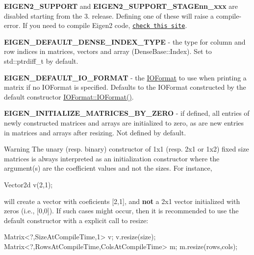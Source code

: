 \begin{DoxyItemize}
\item {\bfseries E\+I\+G\+E\+N2\+\_\+\+S\+U\+P\+P\+O\+RT} and {\bfseries E\+I\+G\+E\+N2\+\_\+\+S\+U\+P\+P\+O\+R\+T\+\_\+\+S\+T\+A\+G\+Enn\+\_\+xxx} are disabled starting from the 3. release. Defining one of these will raise a compile-\/error. If you need to compile Eigen2 code, \href{http://eigen.tuxfamily.org/index.php?title=Eigen2}{\tt check this site}.
\item {\bfseries E\+I\+G\+E\+N\+\_\+\+D\+E\+F\+A\+U\+L\+T\+\_\+\+D\+E\+N\+S\+E\+\_\+\+I\+N\+D\+E\+X\+\_\+\+T\+Y\+PE} -\/ the type for column and row indices in matrices, vectors and array (Dense\+Base\+::\+Index). Set to {\ttfamily std\+::ptrdiff\+\_\+t} by default.
\item {\bfseries E\+I\+G\+E\+N\+\_\+\+D\+E\+F\+A\+U\+L\+T\+\_\+\+I\+O\+\_\+\+F\+O\+R\+M\+AT} -\/ the \hyperlink{group___core___module_struct_eigen_1_1_i_o_format}{I\+O\+Format} to use when printing a matrix if no I\+O\+Format is specified. Defaults to the I\+O\+Format constructed by the default constructor \hyperlink{group___core___module_a637b0b62f49a87c1396a904de46c4856}{I\+O\+Format\+::\+I\+O\+Format()}.
\item {\bfseries E\+I\+G\+E\+N\+\_\+\+I\+N\+I\+T\+I\+A\+L\+I\+Z\+E\+\_\+\+M\+A\+T\+R\+I\+C\+E\+S\+\_\+\+B\+Y\+\_\+\+Z\+E\+RO} -\/ if defined, all entries of newly constructed matrices and arrays are initialized to zero, as are new entries in matrices and arrays after resizing. Not defined by default. \begin{DoxyWarning}{Warning}
The unary (resp. binary) constructor of {\ttfamily 1x1} (resp. {\ttfamily 2x1} or {\ttfamily 1x2}) fixed size matrices is always interpreted as an initialization constructor where the argument(s) are the coefficient values and not the sizes. For instance,
\begin{DoxyCode}
Vector2d v(2,1); 
\end{DoxyCode}
 will create a vector with coeficients \mbox{[}2,1\mbox{]}, and {\bfseries not} a {\ttfamily 2x1} vector initialized with zeros (i.\+e., \mbox{[}0,0\mbox{]}). If such cases might occur, then it is recommended to use the default constructor with a explicit call to resize\+: 
\begin{DoxyCode}
Matrix<?,SizeAtCompileTime,1> v;
v.resize(size);
Matrix<?,RowsAtCompileTime,ColsAtCompileTime> m;
m.resize(rows,cols);
\end{DoxyCode}

\end{DoxyWarning}


\end{DoxyItemize}
